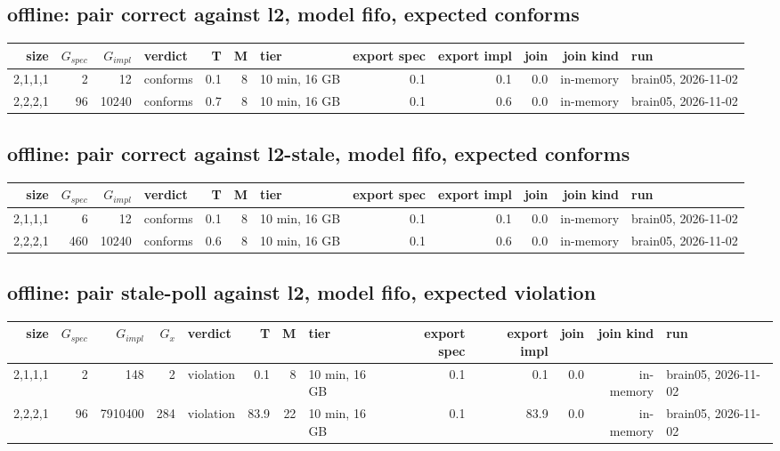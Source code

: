 \documentclass[10pt]{article}
\begin{document}
\subsection*{offline: pair \textsf{correct} against \textsf{l2}, model fifo, expected conforms}
\begin{longtable}{@{}rrrlrrlrrrrl@{}}
\toprule
size & $G_{\mathit{spec}}$ & $G_{\mathit{impl}}$ & verdict & T & M & tier & export spec & export impl & join & join kind & run \\
\midrule
\endhead
\color{red} 2,1,1,1 & 2 & 12 & conforms & 0.1 & 8 & 10 min, 16 GB & 0.1 & 0.1 & 0.0 & in-memory & brain05, 2026-11-02 \\
\color{red} 2,2,2,1 & 96 & 10240 & conforms & 0.7 & 8 & 10 min, 16 GB & 0.1 & 0.6 & 0.0 & in-memory & brain05, 2026-11-02 \\
\bottomrule
\end{longtable}
\subsection*{offline: pair \textsf{correct} against \textsf{l2-stale}, model fifo, expected conforms}
\begin{longtable}{@{}rrrlrrlrrrrl@{}}
\toprule
size & $G_{\mathit{spec}}$ & $G_{\mathit{impl}}$ & verdict & T & M & tier & export spec & export impl & join & join kind & run \\
\midrule
\endhead
\color{red} 2,1,1,1 & 6 & 12 & conforms & 0.1 & 8 & 10 min, 16 GB & 0.1 & 0.1 & 0.0 & in-memory & brain05, 2026-11-02 \\
\color{red} 2,2,2,1 & 460 & 10240 & conforms & 0.6 & 8 & 10 min, 16 GB & 0.1 & 0.6 & 0.0 & in-memory & brain05, 2026-11-02 \\
\bottomrule
\end{longtable}
\subsection*{offline: pair \textsf{stale-poll} against \textsf{l2}, model fifo, expected violation}
\begin{longtable}{@{}rrrrlrrlrrrrl@{}}
\toprule
size & $G_{\mathit{spec}}$ & $G_{\mathit{impl}}$ & $G_x$ & verdict & T & M & tier & export spec & export impl & join & join kind & run \\
\midrule
\endhead
\color{red} 2,1,1,1 & 2 & 148 & 2 & violation & 0.1 & 8 & 10 min, 16 GB & 0.1 & 0.1 & 0.0 & in-memory & brain05, 2026-11-02 \\
\color{red} 2,2,2,1 & 96 & 7910400 & 284 & violation & 83.9 & 22 & 10 min, 16 GB & 0.1 & 83.9 & 0.0 & in-memory & brain05, 2026-11-02 \\
\bottomrule
\end{longtable}
\end{document}
